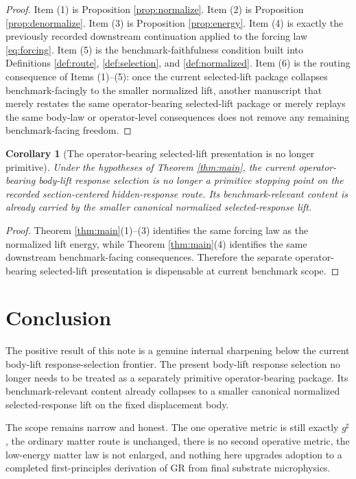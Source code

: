 \documentclass[11pt]{article}
\newcommand{\CompletedMetric}{g^{\sharp}}
\newtheorem{corollary}{Corollary}
\begin{document}
\begin{proof}
Item (1) is Proposition \ref{prop:normalize}. Item (2) is Proposition \ref{prop:denormalize}. Item (3) is Proposition \ref{prop:energy}. Item (4) is exactly the previously recorded downstream continuation applied to the forcing law \eqref{eq:forcing}. Item (5) is the benchmark-faithfulness condition built into Definitions \ref{def:route}, \ref{def:selection}, and \ref{def:normalized}. Item (6) is the routing consequence of Items (1)--(5): once the current selected-lift package collapses benchmark-facingly to the smaller normalized lift, another manuscript that merely restates the same operator-bearing selected-lift package or merely replays the same body-law or operator-level consequences does not remove any remaining benchmark-facing freedom.
\end{proof}

\begin{corollary}[The operator-bearing selected-lift presentation is no longer primitive]
\label{cor:nonprimitive}
Under the hypotheses of Theorem \ref{thm:main}, the current operator-bearing body-lift response selection is no longer a primitive stopping point on the recorded section-centered hidden-response route. Its benchmark-relevant content is already carried by the smaller canonical normalized selected-response lift.
\end{corollary}

\begin{proof}
Theorem \ref{thm:main}(1)--(3) identifies the same forcing law as the normalized lift energy, while Theorem \ref{thm:main}(4) identifies the same downstream benchmark-facing consequences. Therefore the separate operator-bearing selected-lift presentation is dispensable at current benchmark scope.
\end{proof}

\section{Conclusion}

The positive result of this note is a genuine internal sharpening below the current body-lift response-selection frontier. The present body-lift response selection no longer needs to be treated as a separately primitive operator-bearing package. Its benchmark-relevant content already collapses to a smaller canonical normalized selected-response lift on the fixed displacement body.

The scope remains narrow and honest. The one operative metric is still exactly \(\CompletedMetric\), the ordinary matter route is unchanged, there is no second operative metric, the low-energy matter law is not enlarged, and nothing here upgrades adoption to a completed first-principles derivation of GR from final substrate microphysics.
\end{document}
